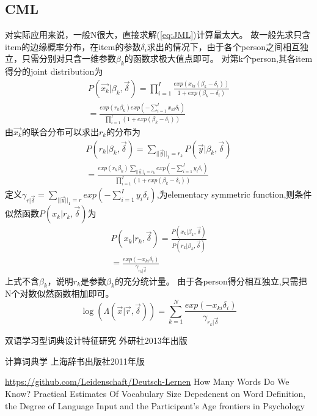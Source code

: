\documentclass[12pt]{article}
\begin{document}
\subsection{CML}
对实际应用来说，一般N很大，直接求解(\ref{eq:JML})计算量太大。
故一般先求只含item的边缘概率分布，在item的参数$\delta_i$求出的情况下，由于各个person之间相互独立，只需分别对只含一维参数$\beta_k$的函数求极大值点即可。
对第k个person,其各item得分的joint distribution为
\begin{equation}
\begin{split}
P(\vec{x_k}|\beta_k,\vec{\delta})=\prod_{i=1}^I \frac{exp(x_{ki}(\beta_k-\delta_i))}{1+exp(\beta_k-\delta_i)}\\
=\frac{exp(r_k\beta_k)exp(-\sum_{i=1}^I x_{ki}\delta_i)}{\prod_{i=1}^I (1+exp(\beta_k-\delta_i))}
\end{split}
\end{equation}
由$\vec{x_k}$的联合分布可以求出$r_k$的分布为
\begin{equation}
\begin{split}
P(r_k|\beta_k,\vec{\delta})=\sum_{||\vec{y}||_1=r_k}P(\vec{y}|\beta_k,\vec{\delta})\\
=\frac{exp(r_k\beta_k)\displaystyle\sum_{||\vec{y}||_1=r_k}exp(-\sum_{i=1}^I y_{i}\delta_i)}{\prod_{i=1}^I (1+exp(\beta_k-\delta_i))}
\end{split}
\end{equation}
定义$\gamma_{r|\vec{\delta}}=\displaystyle\sum_{||\vec{y}||_1=r}exp(-\sum_{i=1}^I y_{i}\delta_i)$,为elementary symmetric function,则条件似然函数$P(x_k|r_k,\vec{\delta})$为
\begin{equation}
\begin{split}
P(x_k|r_k,\vec{\delta})=\frac{P(x_k|\beta_k,\vec{\delta})}{P(r_k|\beta_k,\vec{\delta})}\\
=\frac{exp(-x_{ki}\delta_i)}{\gamma_{r_k|\vec{\delta}}}
\end{split}
\end{equation}
上式不含$\beta_k$，说明$r_k$是参数$\beta_k$的充分统计量。
由于各person得分相互独立,只需把N个对数似然函数相加即可。
\begin{equation}
\log(\Lambda(\vec{x}|\vec{r},\vec{\delta}))=\sum_{k=1}^N \frac{exp(-x_{ki}\delta_i)}{\gamma_{r_k|\vec{\delta}}}
\end{equation}
\begin{thebibliography}{}
双语学习型词典设计特征研究 外研社2013年出版

 计算词典学 上海辞书出版社2011年版

 \url{https://github.com/Leidenschaft/Deutsch-Lernen}
 How Many Words Do We Know? Practical Estimates Of
Vocabulary Size Depedenent on Word Definition, the Degree of Language Input and the Participant's Age		frontiers in Psychology
\end{thebibliography}
\end{document}
